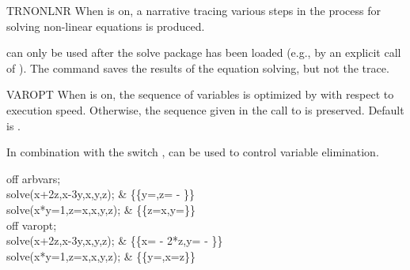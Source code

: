 \begin{Switch}{TRNONLNR}
When  is on, a narrative tracing various steps in
the process for solving non-linear equations is produced.

\begin{Comments}
 can only be used after the solve package has been loaded
(e.g., by an explicit call of ).  The 
command saves the results of the equation solving, but not the trace.
\end{Comments}
\end{Switch}


\begin{Switch}{VAROPT}
When  is on, the sequence of variables is optimized by
 with respect to execution speed. Otherwise, the sequence
given in the call to  is preserved. Default is .

In combination with the switch ,  can be used
to control variable elimination.

\begin{Examples}
off arbvars; \\
solve({x+2z,x-3y},{x,y,z});				&
		   \{\{y=,z= - \}\} \\
solve({x*y=1,z=x},{x,y,z});				&
		   \{\{z=x,y=\}\} \\
off varopt; \\
solve({x+2z,x-3y},{x,y,z});				&
		   \{\{x= - 2*z,y= - \}\} \\
solve({x*y=1,z=x},{x,y,z});				&
		   \{\{y=,x=z\}\} \\
\end{Examples}
\end{Switch}

